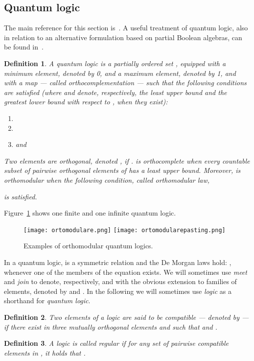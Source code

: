\documentclass{eptcs}
\newtheorem{definition}{Definition}
\begin{document}
\subsection{Quantum logic}
The main reference for this section is~\cite{PP91}. A useful
treatment of quantum logic, also in relation to an alternative
formulation based on partial Boolean algebras, can be found
in~\cite{H89}.
\begin{definition} \cite{PP91}
  A \emph{quantum logic}  is a partially ordered set , equipped with
    a minimum element, denoted by 0, and a maximum element, denoted
  by 1, and with a map
   --- called
  \emph{orthocomplementation} --- such that the following
  conditions are satisfied (where  and  denote,
  respectively, the least upper bound and the greatest lower bound
  with respect to , when they exist):
  
  \begin{enumerate}
    \item  
    \item  
    \item   and 
  \end{enumerate}
  Two elements  are \emph{orthogonal}, denoted , if .  is \emph{orthocomplete} when
  every countable subset of pairwise orthogonal elements of  has a least upper
  bound. Moreover,  is \emph{orthomodular} when the
  following condition, called \emph{orthomodular law},
  
  is satisfied.
\end{definition}
Figure~\ref{f:orthoql} shows one finite and one infinite quantum logic.
\begin{figure}
  \begin{center}
\texttt{[image: ortomodulare.png]}
\quad\quad
\texttt{[image: ortomodularepasting.png]}
  \end{center}
  \caption{Examples of orthomodular quantum logics.}\label{f:orthoql}
\end{figure}
In a quantum logic,  is a symmetric relation and the De
Morgan laws hold: 
, 
whenever one of the members of the equation exists.
We will sometimes use \emph{meet} and
\emph{join} to denote, respectively,  and  with the
obvious extension to families of elements, denoted by  and
. In the following we will sometimes use \emph{logic} as a shorthand
for \emph{quantum logic}.
\begin{definition}
Two elements  of a logic  are said to be
\emph{compatible} --- denoted by  --- if there exist in
 three mutually orthogonal elements  and 
such that  and .
\end{definition}
\begin{definition}
A logic  is called \emph{regular} if for any set
 of pairwise compatible elements in ,
it holds that .
\end{definition}
\end{document}
